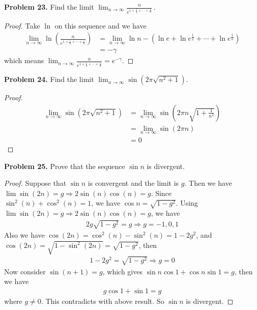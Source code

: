 \documentclass[12pt,leqno]{amsart}
\begin{document}
\noindent
{\bf Problem 23.}
Find the limit
$\displaystyle
\lim_{n\to\infty}
\frac{n}{e^{1+\frac{1}{2}+\cdots +\frac{1}{n}}}\, .
$
\begin{proof}
Take $\ln$ on this sequence and we have 
\begin{align*}
    \lim_{n\to\infty} \ln \left(\frac{n}{e^{1+\frac{1}{2}+\cdots +\frac{1}{n}}} \right) & = \lim_{n\to\infty} \ln n - (\ln e + \ln e^{\frac{1}{2}} + \cdots + \ln e^{\frac{1}{n}}) \\
    & = - \gamma
\end{align*}
which means $\lim_{n\to\infty}
\frac{n}{e^{1+\frac{1}{2}+\cdots +\frac{1}{n}}} = e^{- \gamma}$.
\end{proof}


\noindent
{\bf Problem 24.}
Find the limit
$\displaystyle \lim_{n\to\infty} \sin\left(2\pi\sqrt{n^2+1}\right)$.
\begin{proof}
\begin{align*}
    \lim_{n\to\infty} \sin \left(2\pi\sqrt{n^2+1}\right) & = \lim_{n\to\infty} \sin\left(2\pi n \sqrt{1 + \frac{1}{n^2}}\right) \\
    & = \lim_{n\to\infty} \sin\left(2\pi n\right) \\
    & = 0
\end{align*}

\end{proof}

\noindent
{\bf Problem 25.}
Prove that the sequence $\sin n$ is divergent.
\begin{proof}
Suppose that $\sin n$ is convergent and the limit is $g$. Then we have $\lim \sin(2n) = g \Rightarrow 2 \sin (n) \cos (n) = g$. Since $\sin^2(n) + \cos^2(n) = 1$, we have $\cos n = \sqrt{1 - g^2}$. Using $\lim \sin(2n) = g \Rightarrow 2 \sin (n) \cos (n) = g$, we have 
\begin{align*}
    2 g \sqrt{1-g^2} = g \Rightarrow g = -1,0,1
\end{align*}
Also we have $\cos (2n) = \cos^2(n) - \sin^2(n) = 1 - 2g^2$, and $\cos(2n) = \sqrt{1 - \sin^2(2n)} = \sqrt{1 - g^2}$, then
\begin{align*}
    1 - 2g^2 = \sqrt{1 - g^2} \Rightarrow g = 0
\end{align*}
Now consider $\sin(n+1) = g$, which gives $\sin n \cos 1 + \cos n \sin 1 = g$, then we have 
\begin{align*}
    g \cos 1 + \sin 1 = g
\end{align*}
where $g \neq 0$. This contradicts with above result. So $\sin n$ is divergent.
\end{proof}
\end{document}
